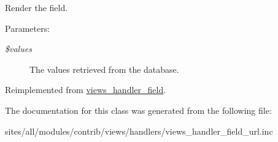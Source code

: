 Render the field.

\begin{Desc}
\item[Parameters:]
\begin{description}
\item[{\em \$values}]The values retrieved from the database. \end{description}
\end{Desc}


Reimplemented from \hyperlink{classviews__handler__field_82ff951c5e9ceb97b2eab86f880cbc1e}{views\_\-handler\_\-field}.

The documentation for this class was generated from the following file:\begin{CompactItemize}
\item 
sites/all/modules/contrib/views/handlers/views\_\-handler\_\-field\_\-url.inc\end{CompactItemize}
